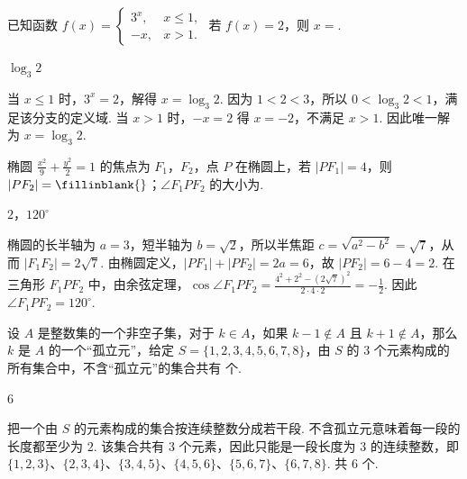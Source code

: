 \begin{problem}
已知函数 \( f(x) = \begin{cases}
3^x, & x \leqslant 1,\\
-x, & x > 1.
\end{cases} \) 若 \( f(x) = 2 \)，则 \( x = \)\fillinblank{}.
\end{problem}

\begin{answer}
\(\log_{3}2\)
\end{answer}

\begin{solution}
当 \(x\leqslant1\) 时，\(3^x=2\)，解得 \(x=\log_3 2\). 因为 \(1<2<3\)，所以 \(0<\log_3 2<1\)，满足该分支的定义域. 当 \(x>1\) 时，\(-x=2\) 得 \(x=-2\)，不满足 \(x>1\). 因此唯一解为 \(x=\log_3 2\).
\end{solution}

\begin{problem}
椭圆 \(\frac{x^2}{9} + \frac{y^2}{2} = 1\) 的焦点为 \(F_1\)，\(F_2\)，点 \(P\) 在椭圆上，若 \(|PF_1| = 4\)，则 \(|PF_2| =\fillinblank{}\)；\(\angle F_1PF_2\) 的大小为\fillinblank{}.
\end{problem}

\begin{answer}
\(2\)，\(120^{\circ}\)
\end{answer}

\begin{solution}
椭圆的长半轴为 \(a=3\)，短半轴为 \(b=\sqrt{2}\)，所以半焦距 \(c=\sqrt{a^2-b^2}=\sqrt7\)，从而 \(|F_1F_2|=2\sqrt7\). 由椭圆定义，\(|PF_1|+|PF_2|=2a=6\)，故 \(|PF_2|=6-4=2\). 在三角形 \(F_1PF_2\) 中，由余弦定理，\(\cos\angle F_1PF_2=\frac{4^2+2^2-(2\sqrt7)^2}{2\cdot4\cdot2}=-\frac12\). 因此 \(\angle F_1PF_2=120^{\circ}\).
\end{solution}

\begin{problem}
设 \(A\) 是整数集的一个非空子集，对于 \(k \in A\)，如果 \(k - 1 \notin A\) 且 \(k + 1 \notin A\)，那么 \(k\) 是 \(A\) 的一个“孤立元”，给定 \(S = \{1, 2, 3, 4, 5, 6, 7, 8\}\)，由 \(S\) 的 \(3\) 个元素构成的所有集合中，不含“孤立元”的集合共有\fillinblank{} 个.
\end{problem}

\begin{answer}
\(6\)
\end{answer}

\begin{solution}
把一个由 \(S\) 的元素构成的集合按连续整数分成若干段. 不含孤立元意味着每一段的长度都至少为 \(2\). 该集合共有 \(3\) 个元素，因此只能是一段长度为 \(3\) 的连续整数，即 \(\{1,2,3\}\)、\(\{2,3,4\}\)、\(\{3,4,5\}\)、\(\{4,5,6\}\)、\(\{5,6,7\}\)、\(\{6,7,8\}\). 共 \(6\) 个.
\end{solution}

